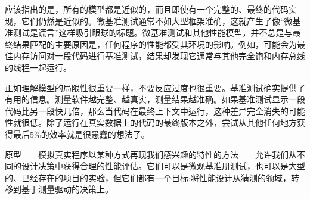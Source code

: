 应该指出的是，所有的模型都是近似的，而且即使有一个完整的、最终的代码实现，它们仍然是近似的。微基准测试通常不如大型框架准确，这就产生了像“微基准测试是谎言”这样吸引眼球的标题。微基准测试和其他性能模型，并不总是与最终结果匹配的主要原因是，任何程序的性能都受其环境的影响。例如，可能会为最佳内存访问对一段代码进行基准测试，结果却发现它通常与其他完全饱和内存总线的线程一起运行。 

正如理解模型的局限性很重要一样，不要反应过度也很重要。基准测试确实提供了有用的信息。测量软件越完整、越真实，测量结果越准确。如果基准测试显示一段代码比另一段快几倍，那么当代码在最终上下文中运行，这种差异完全消失的可能性就很低。除了运行在真实数据上的代码的最终版本之外，尝试从其他任何地方获得最后5\%的效率就是很愚蠢的想法了。

原型——模拟真实程序以某种方式再现我们感兴趣的特性的方法——允许我们从不同的设计决策中获得合理的性能评估。它们可以是微观基准册测试，也可以是大型的、已经存在的项目的实验，但它们都有一个目标:将性能设计从猜测的领域，转移到基于测量驱动的决策上。 
